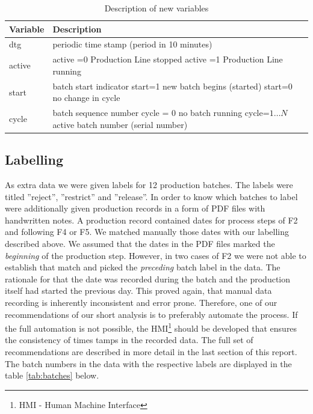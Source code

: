 \documentclass{article}
\begin{document}
\begin{table}[ht]
    \centering
    \begin{tabular}{l p{9.5cm}}
        Variable &  Description \\
        \hline
        dtg & periodic time stamp (period in 10 minutes) \\
        active &   	    active =0   Production Line stopped \newline
                        active =1   Production Line running
        \\
        start&	        batch start indicator \newline
                        start=1 new batch begins (started) \newline
                        start=0 no change in cycle
        \\
        cycle&	batch sequence number \newline
                cycle = 0 no batch running \newline
                cycle=$1\ldots N$  active batch number (serial number)
        \\
        \hline
    \end{tabular}
    \caption{Description of new variables}
    \label{tab:new_attributes}
\end{table}

\subsection{Labelling}
As extra data we were given labels for 12 production batches. The labels were titled ''reject'', ''restrict'' and ''release''. In order to know which batches to label were additionally given production records in a form of PDF files with handwritten notes. A production record contained dates for process steps of F2 and following F4 or F5. We matched manually those dates with our labelling described above. We assumed that the dates in the PDF files marked the \emph{beginning} of the production step. However, in two cases of F2 we were not able to establish that match and picked the \emph{preceding} batch label in the data. The rationale for that the date was recorded during the batch and the production itself had started the previous day. This proved again, that manual data recording is inherently inconsistent and error prone. Therefore, one of our recommendations of our short analysis is to preferably automate the process. If the full automation is not possible, the HMI\footnote{HMI - Human Machine Interface} should be developed that ensures the consistency of times tamps in the recorded data. The full set of recommendations are described in more detail in the last section of this report. The batch numbers in the data with the respective labels are displayed in the table \ref{tab:batches} below.
\end{document}
